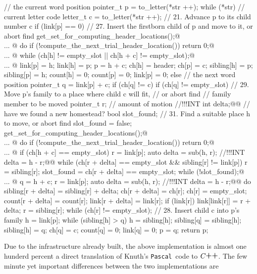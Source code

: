 \documentclass[a4paper,11pt]{article}
\makeatletter
\renewcommand{\=}{\protect\nobreakdash-\hspace{0pt}}
\renewcommand{\~}{\protect\nobreakdash--\hspace{0pt}}
\newcommand{\plusplus}{\textbf{\raisebox{1pt}{++}}}
\newcommand{\cplusplus}{$C\plusplus$}
\newcommand{\pascal}{\code{Pascal}}
\newcommand{\code}[1]{{\tt{#1}}}
\newcommand\code*[1]{\mbox{\code{#1}}}
\let\lst@ifskiplines\iffalse
\newcommand\skipnumbering[1]{%
	\setcounter{lstnumber}{\numexpr#1-1\relax}%
	\let\lst@ifskiplines\iftrue
	\\\lst@PlaceNumber
	\let\lst@ifskiplines\iffalse
	\lst@ifshowskiplines...\fi
}
\let\lst@PlaceNumber\@empty
\makeatother
\begin{document}
\begin{hashtrielisting}[2321]
{	// the current word position
	pointer_t p
		= to_letter(*str ++);
	while (*str) {
		// current letter code
		letter_t c
			= to_letter(*str ++);
		// 21. Advance p to its child number c
		if (link[p] == 0) {
			// 27. Insert the firstborn child of p and move to it, or abort find
			get_set_for_computing_header_locations();@\skipnumbering{2566}@
			do {
				if (!compute_the_next_trial_header_location())
					return 0;@\skipnumbering{2570}@
			} while (ch[h] != empty_slot || ch[h + c] != empty_slot);@\skipnumbering{2572}@
			link[p] = h;
			link[h] = p;
			p = h + c;
			ch[h] = header;
			ch[p] = c;
			sibling[h] = p;
			sibling[p] = h;
			count[h] = 0;
			count[p] = 0;
			link[p] = 0;
		}
		else {
			// the next word position
			pointer_t q
				= link[p] + c;
			if (ch[q] != c) {
				if (ch[q] != empty_slot) {
					// 29. Move p's family to a place where child c will fit,
					//     or abort find
					// family member to be moved
					pointer_t r;
					// amount of motion
					//!!!INT int delta;@\label{cpp-delta-def-int}@
					// have we found a new homestead?
					bool slot_found;
					// 31. Find a suitable place h to move, or abort find
					slot_found = false;
					get_set_for_computing_header_locations();@\skipnumbering{2601}@
					do {
						if (!compute_the_next_trial_header_location())
							return 0;@\skipnumbering{2605}@
						if (ch[h + c] == empty_slot) {
							r = link[p];
							auto delta = sub(h, r); //!!!INT delta = h - r;@\label{cpp-delta-assign-1}@
							while (ch[r + delta] == empty_slot &&
									sibling[r] != link[p])
								r = sibling[r];
							slot_found = ch[r + delta] == empty_slot;
						}
					} while (!slot_found);@\skipnumbering{2615}@
					q = h + c;
					r = link[p];
					auto delta = sub(h, r); //!!!INT delta = h - r;@\label{cpp-delta-assign-2}@
					do {
						sibling[r + delta] = sibling[r] + delta;
						ch[r + delta] = ch[r];
						ch[r] = empty_slot;
						count[r + delta] = count[r];
						link[r + delta] = link[r];
						if (link[r]) link[link[r]] = r + delta;
						r = sibling[r];
					} while (ch[r] != empty_slot);
				}
				// 28. Insert child c into p's family
				h = link[p];
				while (sibling[h] > q)
					h = sibling[h];
				sibling[q] = sibling[h];
				sibling[h] = q;
				ch[q] = c;
				count[q] = 0;
				link[q] = 0;
			}
			p = q;
		}
	}
	return p;
}
\end{hashtrielisting}
%
Due to the infrastructure already built, the above implementation is almost
one hunderd percent a direct translation of Knuth's \pascal\ code to \cplusplus.
The few minute yet important differences between the two implementations are
\end{document}
